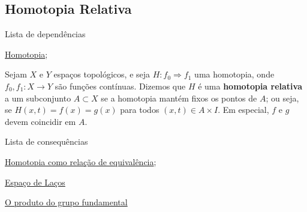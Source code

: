 
\subsection{Homotopia Relativa}
\label{homotopia-relativa-def}
\begin{titlemize}{Lista de dependências}
	\item \hyperref[homotopia-def]{Homotopia};
\end{titlemize}
\begin{defi}
	Sejam $X$ e $Y$ espaços topológicos, e seja $H:f_0\Rightarrow f_1$ uma homotopia, onde $f_0, f_1: X\rightarrow Y$ são funções contínuas. Dizemos que $H$ é uma \textbf{homotopia relativa} a um subconjunto $A\subset X$ se a homotopia mantém fixos os pontos de $A$; ou seja, se $H(x,t) = f(x) = g(x)$ para todos $(x,t) \in A\times I$. Em especial, $f$ e $g$ devem coincidir em $A$.
\end{defi}

\begin{titlemize}{Lista de consequências}
	\item \hyperref[homotopia-relaçao-de-equivalencia-prop]{Homotopia como relação de equivalência};
    \item \hyperref[espaco-lacos-def]{Espaço de Laços}
    \item \hyperref[produto-bem-definido-prop]{O produto do grupo fundamental}
\end{titlemize}

